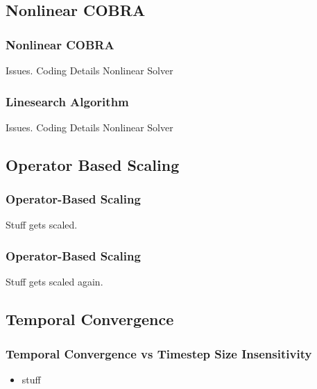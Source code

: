 \documentclass[compress,xcolor=table]{beamer}
\begin{document}
\subsection[COBRA]{Nonlinear COBRA}
\begin{frame}
\frametitle{Nonlinear COBRA}

Issues.
Coding Details
Nonlinear Solver


\end{frame}
\begin{frame}
\frametitle{Linesearch Algorithm}

Issues.
Coding Details
Nonlinear Solver


\end{frame}
\subsection[Scaling]{Operator Based Scaling}
\begin{frame}
\frametitle{Operator-Based Scaling}

Stuff gets scaled.

\end{frame}
\begin{frame}
\frametitle{Operator-Based Scaling}

Stuff gets scaled again.

\end{frame}
\subsection[Convergence]{Temporal Convergence}
\begin{frame}
\frametitle{Temporal Convergence vs Timestep Size Insensitivity}

\begin{itemize}
\item{stuff}
\end{itemize}

\end{frame}
\end{document}
